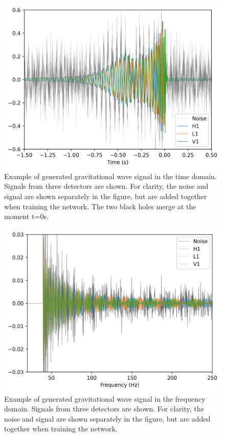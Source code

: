 \begin{figure}
  \centering
  \includegraphics[width=1\linewidth]{media/images/obs_time_domain_lowSNR.png}
  \caption{Example of generated gravitational wave signal in the time domain. Signals from three detectors are shown. For clarity, the noise and signal are shown separately in the figure, but are added together when training the network. The two black holes merge at the moment t=0s. }
  \label{fig:obs_time_domain}
\end{figure}

\begin{figure}
  \centering
  \includegraphics[width=1\linewidth]{media/images/obs_freq_domain_lowSNR.png}
  \caption{Example of generated gravitational wave signal in the frequency domain. Signals from three detectors are shown. For clarity, the noise and signal are shown separately in the figure, but are added together when training the network.}
  \label{fig:obs_freq_domain}
\end{figure}

